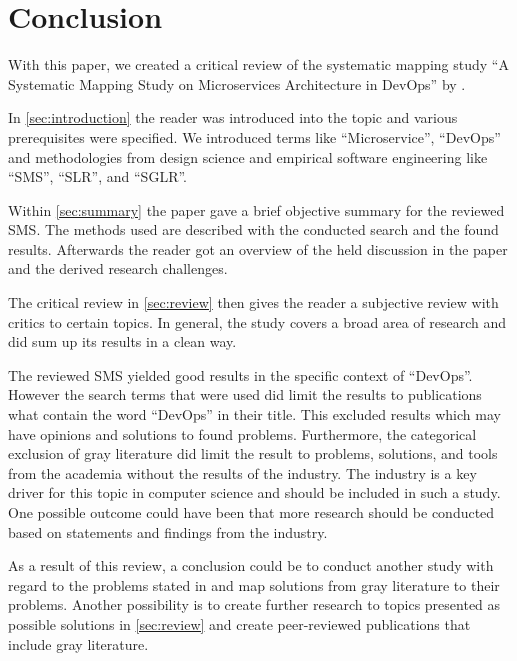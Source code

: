 \section{Conclusion}

With this paper, we created a critical review
of the systematic mapping study
``A Systematic Mapping Study on Microservices Architecture in DevOps''
by \smsAuthors \wsl.

In \autoref{sec:introduction} the reader was introduced into the
topic and various prerequisites were specified. We introduced
terms like ``Microservice'', ``DevOps'' and methodologies from
design science and empirical software engineering like ``SMS'',
``SLR'', and ``SGLR''.

Within \autoref{sec:summary} the paper gave a brief objective
summary for the reviewed SMS. The methods used are described
with the conducted search and the found results. Afterwards
the reader got an overview of the held discussion in the paper
and the derived research challenges.

The critical review in \autoref{sec:review} then gives the
reader a subjective review with critics to certain topics.
In general, the study covers a broad area of research
and did sum up its results in a clean way.

The reviewed SMS yielded good results in the specific
context of ``DevOps''. However the search terms that were
used did limit the results to publications what contain the
word ``DevOps'' in their title. This excluded results which
may have opinions and solutions to found problems.
Furthermore, the categorical exclusion of gray literature
did limit the result to problems, solutions, and tools from the
academia without the results of the industry. The industry is a key driver
for this topic in computer science and should be
included in such a study. One possible outcome could have been
that more research should be conducted based on statements and
findings from the industry.

As a result of this review, a conclusion could be to conduct
another study with regard to the problems stated in \wsls and
map solutions from gray literature to their problems. Another
possibility is to create further research to topics
presented as possible solutions in \autoref{sec:review} and
create peer-reviewed publications that include gray literature.
